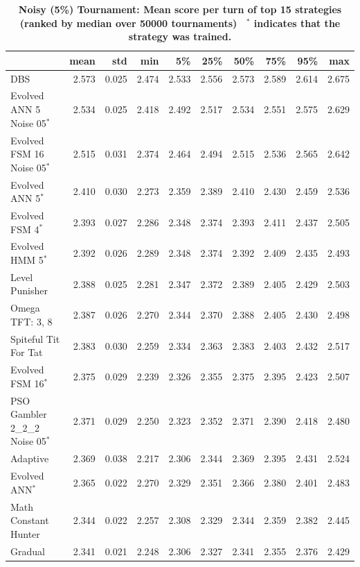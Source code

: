 \documentclass[10pt,letterpaper]{article}
\begin{document}
\begin{table}[!hbtp]
    \centering
        \caption{\bf Noisy (5\%) Tournament: Mean score per turn of top 15 strategies
        (ranked by median over 50000 tournaments)
        ~$^{*}$ indicates that the strategy was trained.}
        \footnotesize
        \begin{tabular}{lrrrrrrrrr}
        \toprule
        {} &   mean &    std &    min &     5\% &    25\% &    50\% &    75\% &    95\% &    max \\
        \midrule
        DBS                              &  2.573 &  0.025 &  2.474 &  2.533 &  2.556 &  2.573 &  2.589 &  2.614 &  2.675 \\
        Evolved ANN 5 Noise 05$^{*}$     &  2.534 &  0.025 &  2.418 &  2.492 &  2.517 &  2.534 &  2.551 &  2.575 &  2.629 \\
        Evolved FSM 16 Noise 05$^{*}$    &  2.515 &  0.031 &  2.374 &  2.464 &  2.494 &  2.515 &  2.536 &  2.565 &  2.642 \\
        Evolved ANN 5$^{*}$              &  2.410 &  0.030 &  2.273 &  2.359 &  2.389 &  2.410 &  2.430 &  2.459 &  2.536 \\
        Evolved FSM 4$^{*}$              &  2.393 &  0.027 &  2.286 &  2.348 &  2.374 &  2.393 &  2.411 &  2.437 &  2.505 \\
        Evolved HMM 5$^{*}$              &  2.392 &  0.026 &  2.289 &  2.348 &  2.374 &  2.392 &  2.409 &  2.435 &  2.493 \\
        Level Punisher                   &  2.388 &  0.025 &  2.281 &  2.347 &  2.372 &  2.389 &  2.405 &  2.429 &  2.503 \\
        Omega TFT: 3, 8                  &  2.387 &  0.026 &  2.270 &  2.344 &  2.370 &  2.388 &  2.405 &  2.430 &  2.498 \\
        Spiteful Tit For Tat             &  2.383 &  0.030 &  2.259 &  2.334 &  2.363 &  2.383 &  2.403 &  2.432 &  2.517 \\
        Evolved FSM 16$^{*}$             &  2.375 &  0.029 &  2.239 &  2.326 &  2.355 &  2.375 &  2.395 &  2.423 &  2.507 \\
        PSO Gambler 2\_2\_2 Noise 05$^{*}$ &  2.371 &  0.029 &  2.250 &  2.323 &  2.352 &  2.371 &  2.390 &  2.418 &  2.480 \\
        Adaptive                         &  2.369 &  0.038 &  2.217 &  2.306 &  2.344 &  2.369 &  2.395 &  2.431 &  2.524 \\
        Evolved ANN$^{*}$                &  2.365 &  0.022 &  2.270 &  2.329 &  2.351 &  2.366 &  2.380 &  2.401 &  2.483 \\
        Math Constant Hunter             &  2.344 &  0.022 &  2.257 &  2.308 &  2.329 &  2.344 &  2.359 &  2.382 &  2.445 \\
        Gradual                          &  2.341 &  0.021 &  2.248 &  2.306 &  2.327 &  2.341 &  2.355 &  2.376 &  2.429 \\
        \bottomrule
        \end{tabular}
        \label{tbl:noisy_score}
\end{table}
\end{document}
